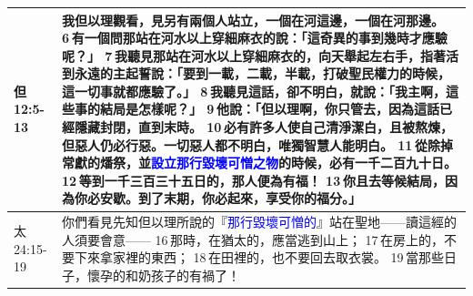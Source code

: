 \begin{table}[H]
\begin{tabular}{p{1.6cm}|p{15.25cm}}
 但12:5-13&我但以理觀看，見另有兩個人站立，一個在河這邊，一個在河那邊。 6 有一個問那站在河水以上穿細麻衣的說：「這奇異的事到幾時才應驗呢？」 7 我聽見那站在河水以上穿細麻衣的，向天舉起左右手，指著活到永遠的主起誓說：「要到一載，二載，半載，打破聖民權力的時候，這一切事就都應驗了。」 8 我聽見這話，卻不明白，就說：「我主啊，這些事的結局是怎樣呢？」 9 他說：「但以理啊，你只管去，因為這話已經隱藏封閉，直到末時。 10 必有許多人使自己清淨潔白，且被熬煉，但惡人仍必行惡。一切惡人都不明白，唯獨智慧人能明白。 11 從除掉常獻的燔祭，並\textcolor{blue}{設立那行毀壞可憎之物}的時候，必有一千二百九十日。 12 等到一千三百三十五日的，那人便為有福！ 13 你且去等候結局，因為你必安歇。到了末期，你必起來，享受你的福分。」\\\hline 
 
太24:15-19&你們看見先知但以理所說的『\textcolor{blue}{那行毀壞可憎的}』站在聖地——讀這經的人須要會意—— 16 那時，在猶太的，應當逃到山上； 17 在房上的，不要下來拿家裡的東西； 18 在田裡的，也不要回去取衣裳。 19 當那些日子，懷孕的和奶孩子的有禍了！\\\hline
\end{tabular}
\end{table}









